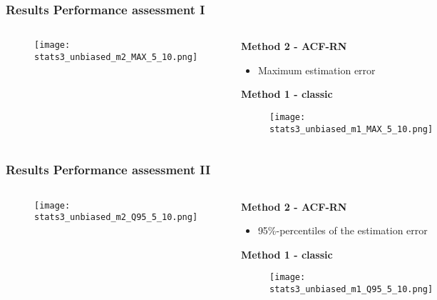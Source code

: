 \documentclass[11pt,aspectratio=169]{beamer}
\begin{document}
	\begin{frame}
		\frametitle{Results \textendash{} Performance assessment I}
		\begin{columns}[t]
			\begin{RIPcolleft}
				\begin{figure}
					\texttt{[image: stats3\_unbiased\_m2\_MAX\_5\_10.png]}
				\end{figure}
			\end{RIPcolleft}
			\begin{RIPcolright}
				\textbf{Method 2 - ACF-RN}\\
				\begin{itemize}
					\item Maximum estimation error
				\end{itemize}
				\vspace{.5em}
				\textbf{Method 1 - classic}\\
				\begin{figure}
					\texttt{[image: stats3\_unbiased\_m1\_MAX\_5\_10.png]}
				\end{figure}
			\end{RIPcolright}
		\end{columns}
	\end{frame}
	\begin{frame}
		\frametitle{Results \textendash{} Performance assessment II}
		\begin{columns}[t]
			\begin{RIPcolleft}
				\begin{figure}
					\texttt{[image: stats3\_unbiased\_m2\_Q95\_5\_10.png]}
				\end{figure}
			\end{RIPcolleft}
			\begin{RIPcolright}
				\textbf{Method 2 - ACF-RN}\\
				\begin{itemize}
					\item 95\%-percentiles of the estimation error
				\end{itemize}
				\vspace{.5em}
				\textbf{Method 1 - classic}\\
				\begin{figure}
					\texttt{[image: stats3\_unbiased\_m1\_Q95\_5\_10.png]}
				\end{figure}
			\end{RIPcolright}
		\end{columns}
	\end{frame}
\end{document}
